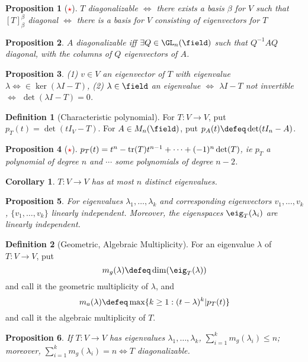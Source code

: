 \documentclass[12pt, oneside]{article}
\theoremstyle{definition}
\newtheorem{defn}{Definition}
\theoremstyle{plain}
\newtheorem{cor}{Corollary}
\newtheorem{prop}{Proposition}
\theoremstyle{remark}
\begin{document}
\begin{prop}[\textcolor{red}{$\star$}]
  $T$ diagonalizable $\iff$ there exists a basis $\beta$ for $V$ such that $[T]_\beta^\beta$ diagonal $\iff$ there is a basis for $V$ consisting of eigenvectors for $T$
\end{prop}

\begin{prop}
  $A$ diagonalizable iff $\exists Q \in \GL_n(\field)$ such that $Q^{-1}A Q$ diagonal, with the columns of $Q$ eigenvectors  of $A$.
\end{prop}

\begin{prop}
  (1) $v \in V$ an eigenvector of $T$ with eigenvalue $\lambda \iff \in \ker(\lambda I - T)$, (2) $\lambda \in \field$ an eigenvalue $\iff$ $\lambda I - T$ not invertible $\iff$ $\det(\lambda I - T) = 0$.
\end{prop}

\begin{defn}[Characteristic polynomial]
  For $T : V \to V$, put $p_T(t) = \det(tI_V - T)$. For $A \in M_n(\field)$, put $p_A(t) \defeq \det(tI_n - A)$.
\end{defn}

\begin{prop}[\textcolor{red}{$\star$}]
  $p_T(t) = t^n - \tr(T)t^{n-1} + \cdots + (-1)^n \det(T)$, ie $p_T$ a polynomial of degree $n$ and $\cdots$ some polynomials of degree $n-2$.
\end{prop}

\begin{cor}
  $T : V \to V$ has at most $n$ distinct eigenvalues.
\end{cor}

\begin{prop}
  For eigenvalues $\lambda_1, \dots, \lambda_k$ and corresponding eigenvectors $v_1, \dots, v_k$, $\{v_1, \dots, v_k\}$ linearly independent. Moreover, the eigenspaces $\eig_T(\lambda_i)$ are linearly independent.
\end{prop}

\begin{defn}[Geometric, Algebraic Multiplicity]
  For an eigenvalue $\lambda$ of $T : V \to V$, put \[
  m_g(\lambda) \defeq \dim(\eig_T(\lambda)) 
  \]
  and call it the geometric multiplicity of $\lambda$, and \[
  m_a(\lambda) \defeq \max \{k \geq 1 : (t - \lambda)^k \vert p_T(t)\}
  \]
  and call it the algebraic multiplicity of $T$.
\end{defn}

\begin{prop}
  If $T : V \to V$ has eigenvalues $\lambda_1, \dots, \lambda_k$, $\sum_{i=1}^k m_g(\lambda_i) \leq n$; moreover, $\sum_{i=1}^k m_g(\lambda_i) = n \iff T$ diagonalizable.
\end{prop}
\end{document}
